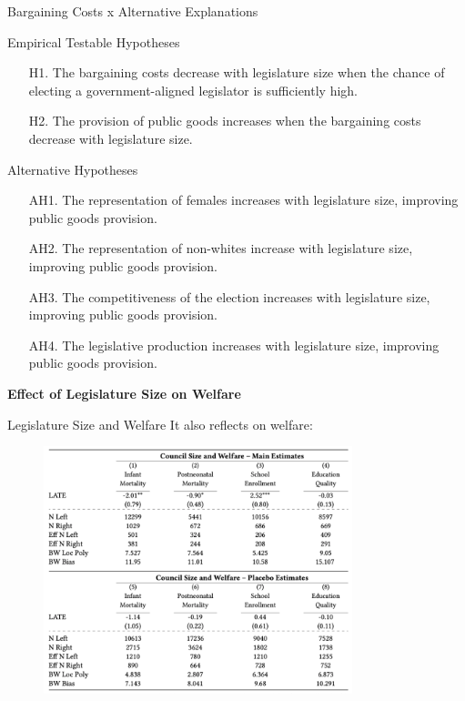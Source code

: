 \documentclass[11pt]{beamer}
\newcommand{\cmark}{\textcolor{green}{\ding{51}}}
\newcommand{\xmark}{\textcolor{red}{\ding{55}}}
\begin{document}
\begin{frame}{Bargaining Costs x Alternative Explanations}
\begin{block}{Empirical Testable Hypotheses}
\begin{enumerate}
  \item[H1.] The bargaining costs decrease with legislature size when the chance of electing a government-aligned legislator is sufficiently high. \cmark
  \item[H2.] The provision of public goods increases when the bargaining costs decrease with legislature size.
\end{enumerate}
\end{block}
\begin{block}{Alternative Hypotheses}
\begin{enumerate}
  \item[AH1.] The representation of females increases with legislature size, improving public goods provision. \xmark
  \item[AH2.] The representation of non-whites increase with legislature size, improving public goods provision. \xmark
  \item[AH3.] The competitiveness of the election increases with legislature size, improving public goods provision. \xmark
  \item[AH4.] The legislative production increases with legislature size, improving public goods provision. \xmark
\end{enumerate}
\end{block}
\end{frame}

\begin{frame}
\begin{center}
\Large{\textbf{Effect of Legislature Size on Welfare}}
\end{center}
\end{frame}

\begin{frame}{Legislature Size and Welfare}
It also reflects on welfare:
  \begin{figure}[htb]
   \centering
   \includegraphics[width=0.8\textwidth]{fig5.png}
  \end{figure}
\end{frame}
\end{document}
